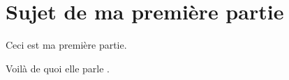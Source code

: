 \section{Sujet de ma première partie}

Ceci est ma première partie.

Voilà de quoi elle parle \cite{ein05}.
